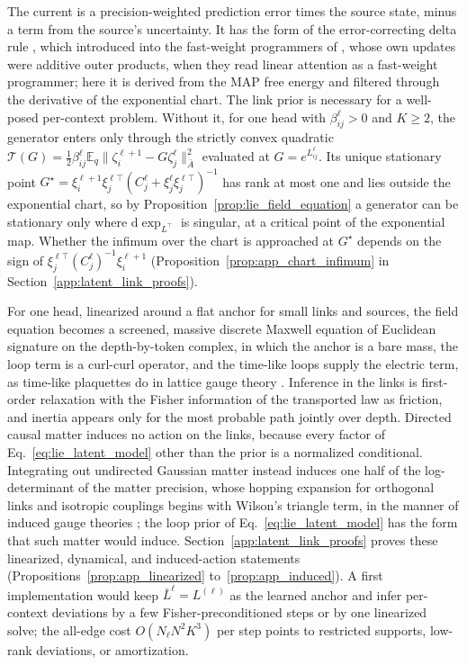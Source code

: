 \documentclass[twoside,11pt]{article}
\begin{document}
The current is a precision-weighted prediction error times the source state, minus a term from the source's uncertainty. It has the form of the error-correcting delta rule \citep{WidrowHoff1960}, which \citet{Schlag2021} introduced into the fast-weight programmers of \citet{Schmidhuber1992}, whose own updates were additive outer products, when they read linear attention as a fast-weight programmer; here it is derived from the MAP free energy and filtered through the derivative of the exponential chart. The link prior is necessary for a well-posed per-context problem. Without it, for one head with $\beta_{ij}^\ell>0$ and $K\ge2$, the generator enters only through the strictly convex quadratic $\mathcal T(G)=\tfrac12\beta_{ij}^\ell\mathbb E_q\|\zeta_i^{\ell+1}-G\zeta_j^\ell\|_{\bar A}^2$ evaluated at $G=e^{L_{ij}^\ell}$. Its unique stationary point $G^\star=\xi_i^{\ell+1}\xi_j^{\ell\top}(C_j^\ell+\xi_j^\ell\xi_j^{\ell\top})^{-1}$ has rank at most one and lies outside the exponential chart, so by Proposition~\ref{prop:lie_field_equation} a generator can be stationary only where $\mathrm d\exp_{L^\top}$ is singular, at a critical point of the exponential map. Whether the infimum over the chart is approached at $G^\star$ depends on the sign of $\xi_j^{\ell\top}(C_j^\ell)^{-1}\xi_i^{\ell+1}$ (Proposition~\ref{prop:app_chart_infimum} in Section~\ref{app:latent_link_proofs}).

For one head, linearized around a flat anchor for small links and sources, the field equation becomes a screened, massive discrete Maxwell equation of Euclidean signature on the depth-by-token complex, in which the anchor is a bare mass, the loop term is a curl-curl operator, and the time-like loops supply the electric term, as time-like plaquettes do in lattice gauge theory \citep{KogutSusskind1975,Creutz1983}. Inference in the links is first-order relaxation with the Fisher information of the transported law as friction, and inertia appears only for the most probable path jointly over depth. Directed causal matter induces no action on the links, because every factor of Eq.~\eqref{eq:lie_latent_model} other than the prior is a normalized conditional. Integrating out undirected Gaussian matter instead induces one half of the log-determinant of the matter precision, whose hopping expansion for orthogonal links and isotropic couplings begins with Wilson's triangle term, in the manner of induced gauge theories \citep{KazakovMigdal1993}; the loop prior of Eq.~\eqref{eq:lie_latent_model} has the form that such matter would induce. Section~\ref{app:latent_link_proofs} proves these linearized, dynamical, and induced-action statements (Propositions~\ref{prop:app_linearized} to~\ref{prop:app_induced}). A first implementation would keep $\bar L^\ell=L^{(\ell)}$ as the learned anchor and infer per-context deviations by a few Fisher-preconditioned steps or by one linearized solve; the all-edge cost $O(N_\ell N^2K^3)$ per step points to restricted supports, low-rank deviations, or amortization.
\end{document}
